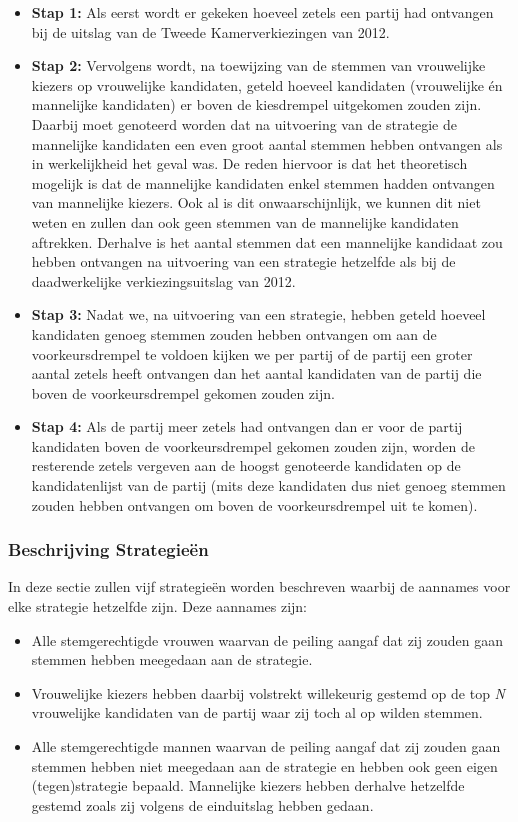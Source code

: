\begin{itemize}
	\item
\textbf{Stap 1:} Als eerst wordt er gekeken hoeveel zetels een partij had ontvangen bij de uitslag van de Tweede Kamerverkiezingen van 2012. 
	\item
\textbf{Stap 2:} Vervolgens wordt, na toewijzing van de stemmen van vrouwelijke kiezers op vrouwelijke kandidaten, geteld hoeveel kandidaten (vrouwelijke én mannelijke kandidaten) er boven de kiesdrempel uitgekomen zouden zijn. Daarbij moet genoteerd worden dat na uitvoering van de strategie de mannelijke kandidaten een even groot aantal stemmen hebben ontvangen als in werkelijkheid het geval was. De reden hiervoor is dat het theoretisch mogelijk is dat de mannelijke kandidaten enkel stemmen hadden ontvangen van mannelijke kiezers. Ook al is dit onwaarschijnlijk, we kunnen dit niet weten en zullen dan ook geen stemmen van de mannelijke kandidaten aftrekken. Derhalve is het aantal stemmen dat een mannelijke kandidaat zou hebben ontvangen na uitvoering van een strategie hetzelfde als bij de daadwerkelijke verkiezingsuitslag van 2012.
	\item
\textbf{Stap 3:} Nadat we, na uitvoering van een strategie, hebben geteld hoeveel kandidaten genoeg stemmen zouden hebben ontvangen om aan de voorkeursdrempel te voldoen kijken we per partij of de partij een groter aantal zetels heeft ontvangen dan het aantal kandidaten van de partij die boven de voorkeursdrempel gekomen zouden zijn. 
	\item
\textbf{Stap 4:} Als de partij meer zetels had ontvangen dan er voor de partij kandidaten boven de voorkeursdrempel gekomen zouden zijn, worden de resterende zetels vergeven aan de hoogst genoteerde kandidaten op de kandidatenlijst van de partij (mits deze kandidaten dus niet genoeg stemmen zouden hebben ontvangen om boven de voorkeursdrempel uit te komen).
\end{itemize}


\subsubsection*{Beschrijving Strategie\"{e}n} \label{besS}
In deze sectie zullen vijf strategie\"{e}n worden beschreven waarbij de aannames voor elke strategie hetzelfde zijn. Deze aannames zijn:

\begin{itemize}
	\item 
Alle stemgerechtigde vrouwen waarvan de peiling aangaf dat zij zouden gaan stemmen hebben meegedaan aan de strategie.
	\item
Vrouwelijke kiezers hebben daarbij volstrekt willekeurig gestemd op de top \textit{N} vrouwelijke kandidaten van de partij waar zij toch al op wilden stemmen.	
	\item
Alle stemgerechtigde mannen waarvan de peiling aangaf dat zij zouden gaan stemmen hebben niet meegedaan aan de strategie en hebben ook geen eigen (tegen)strategie bepaald. Mannelijke kiezers hebben derhalve hetzelfde gestemd zoals zij volgens de einduitslag hebben gedaan. 
\end{itemize}


